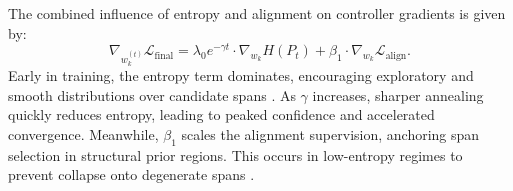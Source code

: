 The combined influence of entropy and alignment on controller gradients is given by:
\begin{equation}
\nabla_{w_k^{(t)}} \mathcal{L}_{\text{final}} = \lambda_0 e^{-\gamma t} \cdot \nabla_{w_k} H(P_t) + \beta_1 \cdot \nabla_{w_k} \mathcal{L}_{\text{align}}.
\label{eq:gradient_flow}
\end{equation}
Early in training, the entropy term dominates, encouraging exploratory and smooth distributions over candidate spans \cite{pereyra2017regularizing}. As \(\gamma\) increases, sharper annealing quickly reduces entropy, leading to peaked confidence and accelerated convergence. Meanwhile, \(\beta_1\) scales the alignment supervision, anchoring span selection in structural prior regions. This occurs in low-entropy regimes to prevent collapse onto degenerate spans \cite{liu2024structured}.


